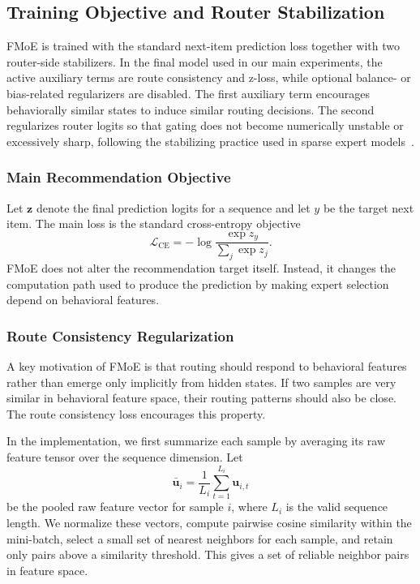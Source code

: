 \documentclass[sigconf,anonymous,review]{acmart}
\begin{document}
\subsection{Training Objective and Router Stabilization}
\label{sec:training-objective}

FMoE is trained with the standard next-item prediction loss together with two router-side stabilizers. In the final model used in our main experiments, the active auxiliary terms are route consistency and z-loss, while optional balance- or bias-related regularizers are disabled. The first auxiliary term encourages behaviorally similar states to induce similar routing decisions. The second regularizes router logits so that gating does not become numerically unstable or excessively sharp, following the stabilizing practice used in sparse expert models~\cite{zoph2022stmoe}.

\subsubsection{Main Recommendation Objective}

Let $\mathbf{z}$ denote the final prediction logits for a sequence and let $y$ be the target next item. The main loss is the standard cross-entropy objective
\[
\mathcal{L}_{\mathrm{CE}}
=
-\log \frac{\exp z_y}{\sum_{j}\exp z_j}.
\]
FMoE does not alter the recommendation target itself. Instead, it changes the computation path used to produce the prediction by making expert selection depend on behavioral features.

\subsubsection{Route Consistency Regularization}

A key motivation of FMoE is that routing should respond to behavioral features rather than emerge only implicitly from hidden states. If two samples are very similar in behavioral feature space, their routing patterns should also be close. The route consistency loss encourages this property.

In the implementation, we first summarize each sample by averaging its raw feature tensor over the sequence dimension. Let
\[
\bar{\mathbf{u}}_i
=
\frac{1}{L_i}\sum_{t=1}^{L_i}\mathbf{u}_{i,t}
\]
be the pooled raw feature vector for sample $i$, where $L_i$ is the valid sequence length. We normalize these vectors, compute pairwise cosine similarity within the mini-batch, select a small set of nearest neighbors for each sample, and retain only pairs above a similarity threshold. This gives a set of reliable neighbor pairs in feature space.
\end{document}

